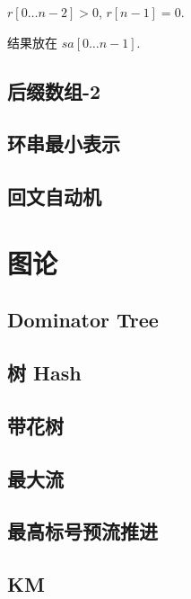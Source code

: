 \documentclass[landscape, twocolumn, 8pt, a4paper, twoside]{extarticle}
\begin{document}
$r[0 \ldots n - 2] > 0$, $r[n - 1] = 0$.

结果放在 $sa[0 \ldots n - 1]$.


\subsection{后缀数组-2}


\subsection{环串最小表示}

\subsection{回文自动机}


\section{图论}
\subsection{Dominator Tree}


\subsection{树 Hash}


\subsection{带花树}


\subsection{最大流}


\subsection{最高标号预流推进}


\subsection{KM}

\end{document}
